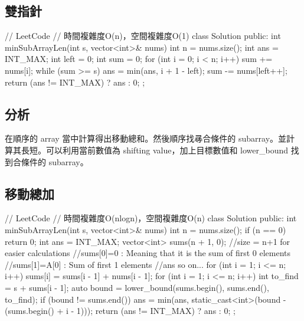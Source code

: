 \subsection{雙指針}
\begin{Code}
// LeetCode
// 時間複雜度O(n)，空間複雜度O(1)
class Solution {
public:
    int minSubArrayLen(int s, vector<int>& nums)
    {
        int n = nums.size();
        int ans = INT_MAX;
        int left = 0;
        int sum = 0;
        for (int i = 0; i < n; i++) {
            sum += nums[i];
            while (sum >= s) {
                ans = min(ans, i + 1 - left);
                sum -= nums[left++];
            }
        }
        return (ans != INT_MAX) ? ans : 0;
    }
};
\end{Code}


\subsection{分析}
在順序的 array 當中計算得出移動總和。然後順序找㝷合條件的 subarray。並計算其長短。可以利用當前數值為 shifting value，加上目標數值和 lower_bound 找到合條件的 subarray。

\subsection{移動總加}
\begin{Code}
// LeetCode
// 時間複雜度O(nlogn)，空間複雜度O(n)
class Solution {
public:
    int minSubArrayLen(int s, vector<int>& nums)
    {
        int n = nums.size();
        if (n == 0)
            return 0;
        int ans = INT_MAX;
        vector<int> sums(n + 1, 0); //size = n+1 for easier calculations
        //sums[0]=0 : Meaning that it is the sum of first 0 elements
        //sums[1]=A[0] : Sum of first 1 elements
        //ans so on...
        for (int i = 1; i <= n; i++)
            sums[i] = sums[i - 1] + nums[i - 1];
        for (int i = 1; i <= n; i++) {
            int to_find = s + sums[i - 1];
            auto bound = lower_bound(sums.begin(), sums.end(), to_find);
            if (bound != sums.end()) {
                ans = min(ans, static_cast<int>(bound - (sums.begin() + i - 1)));
            }
        }
        return (ans != INT_MAX) ? ans : 0;
    }
};
\end{Code}
